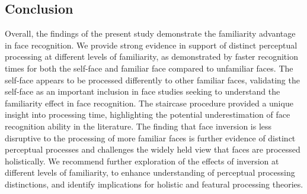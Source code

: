 \documentclass[
  authoryear,
  review,
  3p,
  onecolumn]{elsarticle}
\begin{document}
\subsection{Conclusion}\label{conclusion}

Overall, the findings of the present study demonstrate the familiarity
advantage in face recognition. We provide strong evidence in support of
distinct perceptual processing at different levels of familiarity, as
demonstrated by faster recognition times for both the self-face and
familiar face compared to unfamiliar faces. The self-face appears to be
processed differently to other familiar faces, validating the self-face
as an important inclusion in face studies seeking to understand the
familiarity effect in face recognition. The staircase procedure provided
a unique insight into processing time, highlighting the potential
underestimation of face recognition ability in the literature. The
finding that face inversion is less disruptive to the processing of more
familiar faces is further evidence of distinct perceptual processes and
challenges the widely held view that faces are processed holistically.
We recommend further exploration of the effects of inversion at
different levels of familiarity, to enhance understanding of perceptual
processing distinctions, and identify implications for holistic and
featural processing theories.


  
\end{document}
